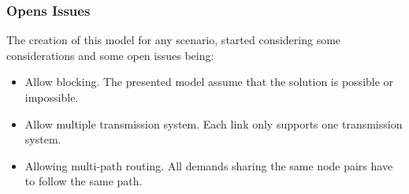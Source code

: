 \subsubsection{Opens Issues}

The creation of this model for any scenario, started considering some considerations and some open issues being:

\begin{itemize}
  \item Allow blocking.
  \subitem The presented model assume that the solution is possible or impossible.
  \item Allow multiple transmission system.
  \subitem Each link only supports one transmission system.
  \item Allowing multi-path routing.
  \subitem All demands sharing the same node pairs have to follow the same path.
\end{itemize}

